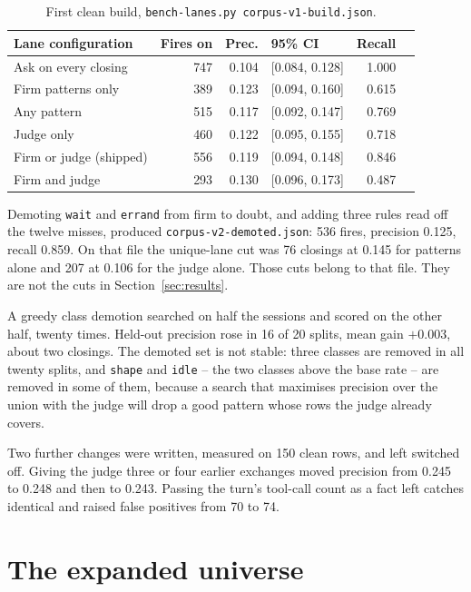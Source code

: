 \begin{table}[ht]
\centering
\begin{tabular}{lrrlrr}
\toprule
Lane configuration & Fires on & Prec. & 95\% CI & Recall \\
\midrule
Ask on every closing & 747 & 0.104 & [0.084, 0.128] & 1.000 \\
\midrule
Firm patterns only & 389 & 0.123 & [0.094, 0.160] & 0.615 \\
Any pattern & 515 & 0.117 & [0.092, 0.147] & 0.769 \\
Judge only & 460 & 0.122 & [0.095, 0.155] & 0.718 \\
Firm or judge (shipped) & 556 & 0.119 & [0.094, 0.148] & 0.846 \\
Firm and judge & 293 & 0.130 & [0.096, 0.173] & 0.487 \\
\bottomrule
\end{tabular}
\caption{First clean build, \texttt{bench-lanes.py corpus-v1-build.json}.}
\label{tab:v1}
\end{table}

Demoting \texttt{wait} and \texttt{errand} from firm to doubt, and adding three
rules read off the twelve misses, produced \texttt{corpus-v2-demoted.json}:
536 fires, precision 0.125, recall 0.859. On that file the unique-lane cut
was 76 closings at 0.145 for patterns alone and 207 at 0.106 for the judge
alone. Those cuts belong to that file. They are not the cuts in
Section~\ref{sec:results}.

A greedy class demotion searched on half the sessions and scored on the
other half, twenty times. Held-out precision rose in 16 of 20 splits, mean
gain $+0.003$, about two closings. The demoted set is not stable: three
classes are removed in all twenty splits, and \texttt{shape} and
\texttt{idle} -- the two classes above the base rate -- are removed in some
of them, because a search that maximises precision over the union with the
judge will drop a good pattern whose rows the judge already covers.

Two further changes were written, measured on 150 clean rows, and left
switched off. Giving the judge three or four earlier exchanges moved
precision from 0.245 to 0.248 and then to 0.243. Passing the turn's tool-call
count as a fact left catches identical and raised false positives from 70
to 74.

\section{The expanded universe}
\label{app:expand}

